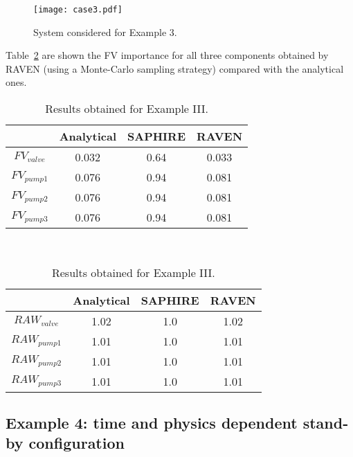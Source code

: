 \begin{figure}
    \centering
    \centerline{\texttt{[image: case3.pdf]}}
    \caption{System considered for Example 3.}
    \label{fig:example4}
\end{figure}

Table~\ref{tab:example3} are shown the FV importance for all three components obtained by RAVEN (using a Monte-Carlo 
sampling strategy) compared with the analytical ones.

\begin{table}
    \centering
    \caption{Results obtained for Example III.}
    \begin{minipage}{.5\linewidth}
      \centering
      \begin{tabular}{c | c | c | c} 
        \hline 
         & Analytical & SAPHIRE & RAVEN \\ 
        \hline 
        $FV_{valve}$ & 0.032 & 0.64 & 0.033  \\
        $FV_{pump1}$ & 0.076 & 0.94 & 0.081  \\
        $FV_{pump2}$ & 0.076 & 0.94 & 0.081  \\
        $FV_{pump3}$ & 0.076 & 0.94 & 0.081  \\ 
        \hline 
      \end{tabular}
    \end{minipage} \\[2ex]
    \begin{minipage}{.5\linewidth}
      \centering
      \begin{tabular}{c | c | c | c} 
        \hline 
         & Analytical & SAPHIRE & RAVEN \\ 
        \hline 
        $RAW_{valve}$ & 1.02 & 1.0 & 1.02  \\
        $RAW_{pump1}$ & 1.01 & 1.0 & 1.01  \\
        $RAW_{pump2}$ & 1.01 & 1.0 & 1.01  \\
        $RAW_{pump3}$ & 1.01 & 1.0 & 1.01  \\ 
        \hline 
      \end{tabular}
    \end{minipage} 
    \label{tab:example3}
\end{table}


\subsection{Example 4: time and physics dependent stand-by configuration}
\label{sec:example4}


